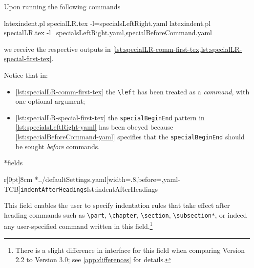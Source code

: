 	Upon running the following commands
	\begin{widepage}
		\begin{commandshell}
latexindent.pl specialLR.tex -l=specialsLeftRight.yaml      
latexindent.pl specialLR.tex -l=specialsLeftRight.yaml,specialBeforeCommand.yaml      
    \end{commandshell}
	\end{widepage}
	we receive the respective outputs in \cref{lst:specialLR-comm-first-tex,lst:specialLR-special-first-tex}.

	\begin{minipage}{.49\linewidth}
	\end{minipage}
	\hfill
	\begin{minipage}{.49\linewidth}
	\end{minipage}

	Notice that in:
	\begin{itemize}
		\item \cref{lst:specialLR-comm-first-tex} the \lstinline!\left! has been treated as a \emph{command}, with one optional argument;
		\item \cref{lst:specialLR-special-first-tex} the \texttt{specialBeginEnd} pattern in \cref{lst:specialsLeftRight-yaml} has been obeyed
		      because \cref{lst:specialBeforeCommand-yaml} specifies that the \texttt{specialBeginEnd} should be sought \emph{before} commands.
	\end{itemize}

*{fields}
	\begin{wrapfigure}[17]{r}[0pt]{8cm}
		\cmhlistingsfromfile[style=indentAfterHeadings]*{../defaultSettings.yaml}[width=.8\linewidth,before=\centering,yaml-TCB]{\texttt{indentAfterHeadings}}{lst:indentAfterHeadings}
	\end{wrapfigure}
	This field enables the user to specify
	indentation rules that take effect after heading commands such as \lstinline!\part!, \lstinline!\chapter!,
	\lstinline!\section!, \lstinline!\subsection*!, or indeed any user-specified command written in this field.\footnote{There is a slight
		difference in interface for this field when comparing Version 2.2 to Version 3.0; see \vref{app:differences} for details.}

